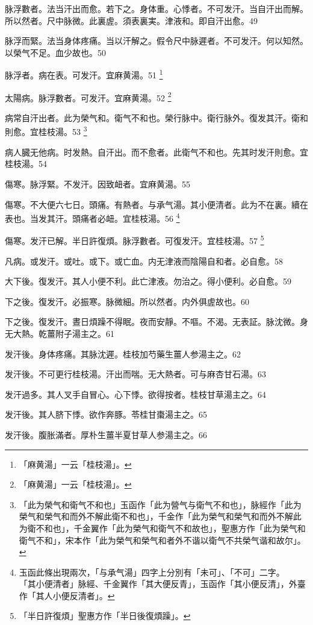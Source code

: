 脉浮數者。法当汗出而愈。若下之。身体重。心悸者。不可发汗。当自汗出而解。所以然者。尺中脉微。此裏虗。須表裏実。津液和。即自汗出愈。49

脉浮而緊。法当身体疼痛。当以汗解之。假令尺中脉遲者。不可发汗。何以知然。以榮气不足。血少故也。50

脉浮者。病在表。可发汗。宜麻黄湯。51
	\footnote{「麻黄湯」一云「桂枝湯」。}

{\khaaitp 太陽病。}脉浮數者。可发汗。宜麻黄湯。52
	\footnote{「麻黄湯」一云「桂枝湯」。}

病常自汗出者。此为榮气和。衛气不和也。榮行脉中。衛行脉外。復发其汗。衛和則愈。宜桂枝湯。53
	\footnote{「此为榮气和衛气不和也」玉函作「此为營气与衛气不和也」，脉經作「此为榮气和榮气和而外不解此衛不和也」，千金作「此为榮气和榮气和而外不解此为衛不和也」，千金翼作「此为榮气和衛气不和故也」，聖惠方作「此为榮气和衛气不和」，宋本作「此为榮气和榮气和者外不谐以衛气不共榮气谐和故尔」。}

病人臓无他病。时发熱。自汗出。而不愈者。此衛气不和也。先其时发汗則愈。宜桂枝湯。54

傷寒。脉浮緊。不发汗。因致衄者。宜麻黄湯。55

傷寒。不大便六七日。頭痛。有熱者。与承气湯。其小便清者。此为不在裏。續在表也。当发其汗。頭痛者必衄。宜桂枝湯。56
	\footnote{玉函此條出現兩次，「与承气湯」四字上分別有「未可」、「不可」二字。\\「其小便清者」脉經、千金翼作「其大便反青」，玉函作「其小便反清」，外臺作「其人小便反清者」。}

傷寒。发汗已解。半日許復煩。脉浮數者。可復发汗。宜桂枝湯。57
	\footnote{「半日許復煩」聖惠方作「半日後復煩躁」。}

凡病。或发汗。或吐。或下。或亡血。{\khaaitp 内}无津液而陰陽自和者。必自愈。58

大下後。復发汗。其人小便不利。此亡津液。勿治之。得小便利。必自愈。59

下之後。復发汗。必振寒。脉微細。所以然者。内外俱虗故也。60

下之後。復发汗。晝日煩躁不得眠。夜而安靜。不嘔。不渴。无表証。脉沈微。身无大熱。乾薑附子湯主之。61

发汗後。身体疼痛。其脉沈遲。桂枝加芍藥生薑人参湯主之。62

发汗後。{\khaaitp 不可更行桂枝湯。}汗出而喘。无大熱者。可与麻杏甘石湯。63

发汗過多。其人叉手自冒心。心下悸。欲得按者。桂枝甘草湯主之。64

发汗後。其人脐下悸。欲作奔豚。苓桂甘棗湯主之。65

发汗後。腹胀滿者。厚朴{\khaaitp 生薑半夏甘草人参}湯主之。66


